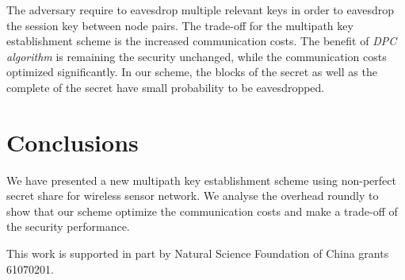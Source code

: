 \documentclass[nocopyrightspace,9pt]{sigplanconf}
\begin{document}
The adversary require to eavesdrop multiple relevant keys in order to eavesdrop
the session key between node pairs. 
The trade-off for the multipath key establishment scheme is the increased communication costs.
The benefit of \textit{DPC algorithm} is remaining the security unchanged, while the communication costs
optimized significantly. In our scheme, the blocks of the secret
as well as the complete of the secret have small probability to be eavesdropped.
%
\section{Conclusions}
We have presented a new multipath key establishment scheme using non-perfect secret share
for wireless sensor network. We analyse the overhead roundly to show that our scheme
optimize the communication costs and make a trade-off of the security performance.
\acks

This work is supported in part by Natural Science Foundation of China
grants 61070201.


\balance

\end{document}
